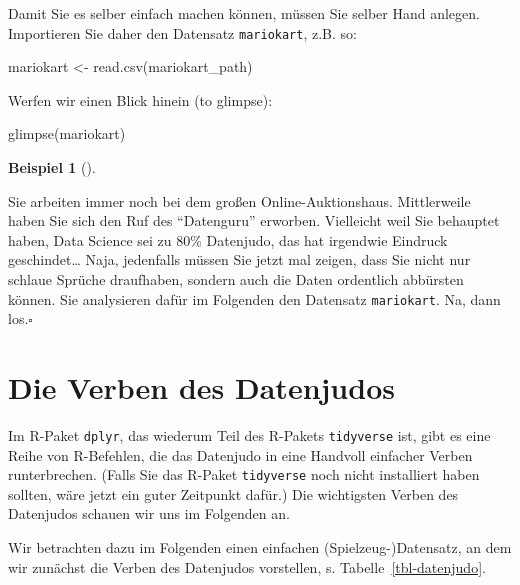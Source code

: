 \documentclass[
  letterpaper,
]{scrbook}
\newenvironment{Shaded}{\begin{snugshade}}{\end{snugshade}}
\newcommand{\FunctionTok}[1]{\textcolor[rgb]{0.28,0.35,0.67}{#1}}
\newcommand{\NormalTok}[1]{\textcolor[rgb]{0.00,0.23,0.31}{#1}}
\newcommand{\OtherTok}[1]{\textcolor[rgb]{0.00,0.23,0.31}{#1}}
\theoremstyle{definition}
\newtheorem{example}{Beispiel}[chapter]
\theoremstyle{definition}
\theoremstyle{definition}
\theoremstyle{remark}
\begin{document}
Damit Sie es selber einfach machen können, müssen Sie selber Hand
anlegen. Importieren Sie daher den Datensatz \texttt{mariokart}, z.B.
so:

\begin{Shaded}
\begin{Highlighting}[]
\NormalTok{mariokart }\OtherTok{\textless{}{-}} \FunctionTok{read.csv}\NormalTok{(mariokart\_path)}
\end{Highlighting}
\end{Shaded}

Werfen wir einen Blick hinein (to glimpse):

\begin{Shaded}
\begin{Highlighting}[]
\FunctionTok{glimpse}\NormalTok{(mariokart)}
\end{Highlighting}
\end{Shaded}

\begin{example}[]\protect\hypertarget{exm-datenjudo}{}\label{exm-datenjudo}

Sie arbeiten immer noch bei dem großen Online-Auktionshaus. Mittlerweile
haben Sie sich den Ruf des ``Datenguru'' erworben. Vielleicht weil Sie
behauptet haben, Data Science sei zu 80\% Datenjudo, das hat irgendwie
Eindruck geschindet\ldots{} Naja, jedenfalls müssen Sie jetzt mal
zeigen, dass Sie nicht nur schlaue Sprüche draufhaben, sondern auch die
Daten ordentlich abbürsten können. Sie analysieren dafür im Folgenden
den Datensatz \texttt{mariokart}. Na, dann los.\(\square\)

\end{example}

\section{Die Verben des Datenjudos}\label{die-verben-des-datenjudos}

Im R-Paket \texttt{dplyr}, das wiederum Teil des R-Pakets
\texttt{tidyverse} ist, gibt es eine Reihe von R-Befehlen, die das
Datenjudo in eine Handvoll einfacher Verben runterbrechen. (Falls Sie
das R-Paket \texttt{tidyverse} noch nicht installiert haben sollten,
wäre jetzt ein guter Zeitpunkt dafür.) Die wichtigsten Verben des
Datenjudos schauen wir uns im Folgenden an.

Wir betrachten dazu im Folgenden einen einfachen (Spielzeug-)Datensatz,
an dem wir zunächst die Verben des Datenjudos vorstellen, s.
Tabelle~\ref{tbl-datenjudo}.
\end{document}
